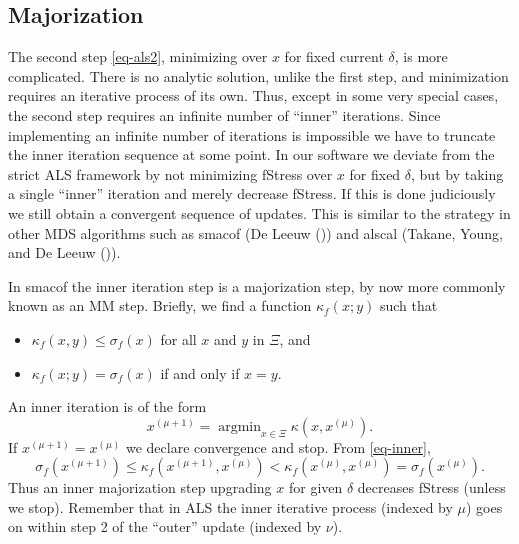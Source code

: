 \documentclass[
  12pt,
  letterpaper,
  DIV=11,
  numbers=noendperiod]{scrartcl}
\providecommand{\tightlist}{%
  \setlength{\itemsep}{0pt}\setlength{\parskip}{0pt}}
\begin{document}
\subsection{Majorization}\label{majorization}

The second step \eqref{eq-als2}, minimizing over \(x\) for fixed current
\(\delta\), is more complicated. There is no analytic solution, unlike
the first step, and minimization requires an iterative process of its
own. Thus, except in some very special cases, the second step requires
an infinite number of ``inner'' iterations. Since implementing an
infinite number of iterations is impossible we have to truncate the
inner iteration sequence at some point. In our software we deviate from
the strict ALS framework by not minimizing fStress over \(x\) for fixed
\(\delta\), but by taking a single ``inner'' iteration and merely
decrease fStress. If this is done judiciously we still obtain a
convergent sequence of updates. This is similar to the strategy in other
MDS algorithms such as smacof (De Leeuw
()) and alscal (Takane, Young, and De
Leeuw ()).

In smacof the inner iteration step is a majorization step, by now more
commonly known as an MM step. Briefly, we find a function
\(\kappa_f(x;y)\) such that

\begin{itemize}
\tightlist
\item
  \(\kappa_f(x,y)\leq\sigma_f(x)\) for all \(x\) and \(y\) in \(\Xi\),
  and
\item
  \(\kappa_f(x;y)=\sigma_f(x)\) if and only if \(x=y\).
\end{itemize}

An inner iteration is of the form \begin{equation}
x^{(\mu+1)}=\mathop{\text{argmin}}_{x\in\Xi}\kappa(x,x^{(\mu)}).\label{eq-inner}
\end{equation} If \(x^{(\mu+1)}=x^{(\mu)}\) we declare convergence and
stop. From \eqref{eq-inner}, \begin{equation}
\sigma_f(x^{(\mu+1)})\leq\kappa_f(x^{(\mu+1)},x^{(\mu)})<\kappa_f(x^{(\mu)},x^{(\mu)})=\sigma_f(x^{(\mu)}).
\label{eq-sandwich}
\end{equation} Thus an inner majorization step upgrading \(x\) for given
\(\delta\) decreases fStress (unless we stop). Remember that in ALS the
inner iterative process (indexed by \(\mu\)) goes on within step 2 of
the ``outer'' update (indexed by \(\nu\)).
\end{document}
